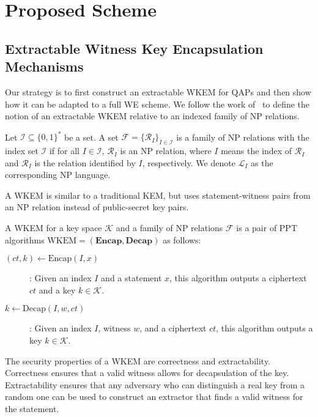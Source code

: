 \section{Proposed Scheme}\label{sec-prop}
\subsection{Extractable Witness Key Encapsulation Mechanisms}
Our strategy is to first construct an extractable WKEM for QAPs and then show how it can be adapted to a full WE scheme. We follow the work of~\textcite{fleischhacker2024extractable} to define the notion of an extractable WKEM relative to an indexed family of NP relations.

\begin{definition}
    Let $\mathcal{I} \subseteq \{0, 1\}^*$ be a set. A set $\mathcal{F} = \{ \mathcal{R}_I \}_{I \in \mathcal{I}}$ is a family of NP relations with the index set $\mathcal{I}$ if for all $I \in \mathcal{I}$, $\mathcal{R}_I$ is an NP relation, where $I$ means the index of $\mathcal{R}_I$ and $\mathcal{R}_I$ is the relation identified by $I$, respectively. We denote $\mathcal{L}_I$ as the corresponding NP language.
\end{definition}

A WKEM is similar to a traditional KEM, but uses statement-witness pairs from an NP relation instead of public-secret key pairs.

\begin{definition}
    A WKEM for a key space $\mathcal{K}$ and a family of NP relations $\mathcal{F}$ is a pair of PPT algorithms $\text{WKEM} = (\textbf{Encap}, \textbf{Decap})$ as follows:
\end{definition}
\begin{description}
    \item[$(ct, k) \gets \text{Encap}(I, x)$]: Given an index $I$ and a statement $x$, this algorithm outputs a ciphertext $ct$ and a key $k \in \mathcal{K}$.
    \item[$k \gets \text{Decap}(I, w, ct)$]: Given an index $I$, witness $w$, and a ciphertext $ct$, this algorithm outputs a key $k \in \mathcal{K}$.
\end{description}

The security properties of a WKEM are correctness and extractability. Correctness ensures that a valid witness allows for decapsulation of the key. Extractability ensures that any adversary who can distinguish a real key from a random one can be used to construct an extractor that finds a valid witness for the statement.

